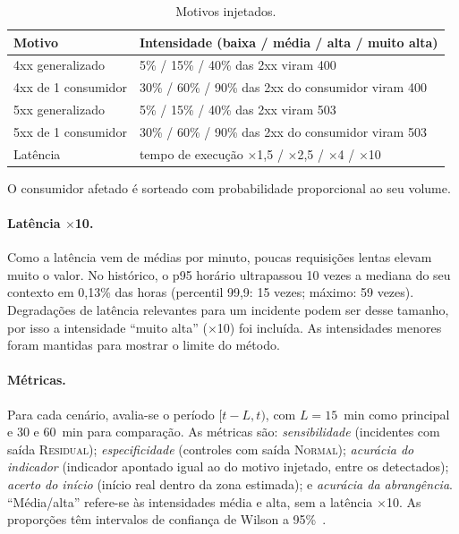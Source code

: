 \documentclass[sigconf,nonacm]{acmart}
\newcommand{\Normal}{\textsc{Normal}\xspace}
\newcommand{\Residual}{\textsc{Residual}\xspace}
\begin{document}
\begin{table}[t]
  \caption{Motivos injetados.}
  \label{tab:falhas}
  \small
  \begin{tabular}{p{}p{}}
    \toprule
    Motivo & Intensidade (baixa / média / alta / muito alta) \\
    \midrule
    4xx generalizado & 5\% / 15\% / 40\% das 2xx viram 400 \\
    4xx de 1 consumidor & 30\% / 60\% / 90\% das 2xx do consumidor viram 400 \\
    5xx generalizado & 5\% / 15\% / 40\% das 2xx viram 503 \\
    5xx de 1 consumidor & 30\% / 60\% / 90\% das 2xx do consumidor viram 503 \\
    Latência & tempo de execução $\times$1,5 / $\times$2,5 / $\times$4 / $\times$10 \\
    \bottomrule
  \end{tabular}
  \par\smallskip\footnotesize O consumidor afetado é sorteado com probabilidade proporcional ao seu volume.
\end{table}

\paragraph{Latência $\times$10.} Como a latência vem de médias por minuto, poucas requisições lentas elevam muito o valor. No histórico, o p95 horário ultrapassou 10 vezes a mediana do seu contexto em 0,13\% das horas (percentil 99,9: 15 vezes; máximo: 59 vezes). Degradações de latência relevantes para um incidente podem ser desse tamanho, por isso a intensidade ``muito alta'' ($\times$10) foi incluída. As intensidades menores foram mantidas para mostrar o limite do método.

\paragraph{Métricas.} Para cada cenário, avalia-se o período $[t-L,t)$, com $L=15$~min como principal e 30 e 60~min para comparação. As métricas são: \emph{sensibilidade} (incidentes com saída \Residual); \emph{especificidade} (controles com saída \Normal); \emph{acurácia do indicador} (indicador apontado igual ao do motivo injetado, entre os detectados); \emph{acerto do início} (início real dentro da zona estimada); e \emph{acurácia da abrangência}. ``Média/alta'' refere-se às intensidades média e alta, sem a latência $\times$10. As proporções têm intervalos de confiança de Wilson a 95\%~\citep{wilson1927probable}.
\end{document}
